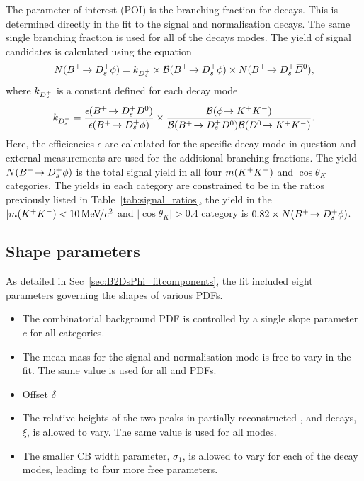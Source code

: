 The parameter of interest (POI) is the branching fraction for \decay{\Bp}{\Dsp\phiz} decays. This is determined directly in the fit to the signal and normalisation decays. The same single branching fraction is used for all of the \Dsp decays modes.
The yield of signal candidates is calculated using the equation 
\begin{equation}
N({{{B}^+}}\!\rightarrow {\ensuremath{{D}^+_{s}}}\phi) = k_{{{D}^+_{s}}} \times {\ensuremath{\mathcal{B}}}({{{B}^+}}\!\rightarrow {\ensuremath{{D}^+_{s}}}\phi) \times N({{{B}^+}}\!\rightarrow {\ensuremath{{D}^+_{s}}}{\ensuremath{{\kern 0.2em\overline{\kern -0.2em D}{}}{}^0}}),
\end{equation}
where $k_{{{D}^+_{s}}}$ is a constant defined for each \Dsp decay mode
\begin{equation}
k_{{{D}^+_{s}}} = \frac{\epsilon({{{B}^+}}\!\rightarrow {\ensuremath{{D}^+_{s}}}{\ensuremath{{\kern 0.2em\overline{\kern -0.2em D}{}}{}^0}})}{\epsilon({{{B}^+}}\!\rightarrow {\ensuremath{{D}^+_{s}}}\phi)} \times  \frac{{\mathcal{B}}(\phi\!\rightarrow {\ensuremath{{K}^+}}{\ensuremath{{K}^-}})}{{\mathcal{B}}({{{B}^+}}\!\rightarrow {\ensuremath{{D}^+_{s}}}{\ensuremath{{\kern 0.2em\overline{\kern -0.2em D}{}}{}^0}}){\mathcal{B}}({{\kern 0.2em\overline{\kern -0.2em D}{}}{}^0}\!\rightarrow {\ensuremath{{K}^+}}{\ensuremath{{K}^-}})}.
\end{equation}
Here, the efficiencies $\epsilon$ are calculated for the specific \Dsp decay mode in question and external measurements are used for the additional branching fractions.
The yield $N({{{B}^+}}\!\rightarrow {\ensuremath{{D}^+_{s}}}\phi)$ is the total signal yield in all four $m({{K}^+}{{K}^-})$ and $\cos\theta_{K}$ categories. The yields in each category are constrained to be in the ratios previously listed in Table~\ref{tab:signal_ratios}, \ie the yield in the $|m({{K}^+}{{K}^-})<10{\mathrm{\,Me\kern -0.1em V\!/}c^2}$ and $|\cos\theta_{K}|>0.4$ category is $0.82\times N({{{B}^+}}\!\rightarrow {\ensuremath{{D}^+_{s}}}\phi)$.



\subsection{Shape parameters}
As detailed in Sec~\ref{sec:B2DsPhi_fitcomponents}, the fit included eight parameters governing the shapes of various PDFs.
\begin{itemize}
\item The combinatorial background PDF is controlled by a single slope parameter $c$ for all categories.
\item The mean \Bp mass for the signal and normalisation mode is free to vary in the fit. The same value is used for all \decay{\Bp}{\Dsp\phiz} and \decay{\Bp}{\Dsp\Dzb} PDFs.
\item {\color{Red}Offset $\delta$}
\item The relative heights of the two peaks in partially reconstructed \decay{\Bp}{\Dssp\phiz}, \decay{\Bp}{\Dssp\Dzb} and \decay{\Bp}{\Dsp\Dstarzb} decays, $\xi$, is allowed to vary. The same value is used for all modes.
\item The smaller CB width parameter, $\sigma_{1}$, is allowed to vary for each of the \Dsp decay modes, leading to four more free parameters. 
\end{itemize}

